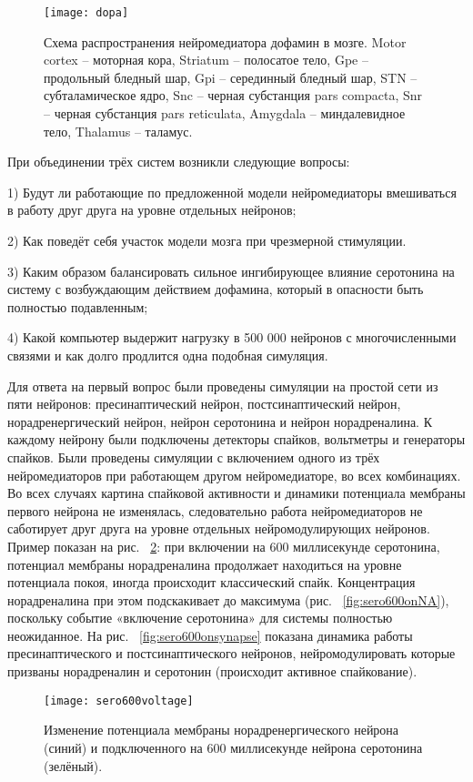 \begin{figure}
	\centering
	\texttt{[image: dopa]}
	\caption{Схема распространения нейромедиатора дофамин в мозге. Motor cortex – моторная кора, Striatum – полосатое тело, Gpe -- продольный бледный шар, Gpi – серединный бледный шар, STN – субталамическое ядро, Snc -- черная субстанция pars compacta, Snr – черная субстанция pars reticulata, Amygdala – миндалевидное тело, Thalamus – таламус.}
	\label{fig:dopa_scheme}
\end{figure}

При объединении трёх систем возникли следующие вопросы:


1) Будут ли работающие по предложенной модели нейромедиаторы вмешиваться в работу друг друга на уровне отдельных нейронов;


2) Как поведёт себя участок модели мозга при чрезмерной стимуляции.


3) Каким образом балансировать сильное ингибирующее влияние серотонина на систему с возбуждающим действием дофамина, который в опасности быть полностью подавленным;


4) Какой компьютер выдержит нагрузку в 500 000 нейронов с многочисленными связями и как долго продлится одна подобная симуляция.


Для ответа на первый вопрос были проведены симуляции на простой сети из пяти нейронов: пресинаптический нейрон, постсинаптический нейрон, норадренергический нейрон, нейрон серотонина и нейрон норадреналина. К каждому нейрону были подключены детекторы спайков, вольтметры и генераторы спайков. Были проведены симуляции с включением одного из трёх нейромедиаторов при работающем другом нейромедиаторе, во всех комбинациях. Во всех случаях картина спайковой активности и динамики потенциала мембраны первого нейрона не изменялась, следовательно работа нейромедиаторов не саботирует друг друга на уровне отдельных нейромодулирующих нейронов. Пример показан на рис. ~\ref{fig:sero600voltage}: при включении на 600 миллисекунде серотонина, потенциал мембраны норадреналина продолжает находиться на уровне потенциала покоя, иногда происходит классический спайк. Концентрация норадреналина при этом подскакивает до максимума (рис. ~\ref{fig:sero600onNA}), поскольку событие «включение серотонина» для системы полностью неожиданное. На рис. ~\ref{fig:sero600onsynapse} показана динамика работы пресинаптического и постсинаптического нейронов, нейромодулировать которые призваны норадреналин и серотонин (происходит активное спайкование).

\begin{figure}
	\centering
	\texttt{[image: sero600voltage]}
	\caption{Изменение потенциала мембраны норадренергического нейрона (синий) и подключенного на 600 миллисекунде нейрона серотонина (зелёный).}
	\label{fig:sero600voltage}
\end{figure}

